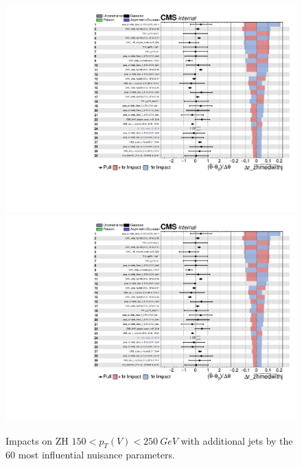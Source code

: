 \begin{figure}
  \centering
  \includegraphics[width=0.85\linewidth,page=1]{figures/impacts/impacts_r_zhmedwithj.pdf}
  \includegraphics[width=0.85\linewidth,page=2]{figures/impacts/impacts_r_zhmedwithj.pdf}
  \caption[Impacts for ZH $150 < p_T(V) < \SI{250}{GeV}$ with jets]{
    Impacts on ZH $150 < p_T(V) < \SI{250}{GeV}$ with additional jets
    by the 60 most influential nuisance parameters.
  }
  \label{fig:impacts_r_zhmedwithj}
\end{figure}

